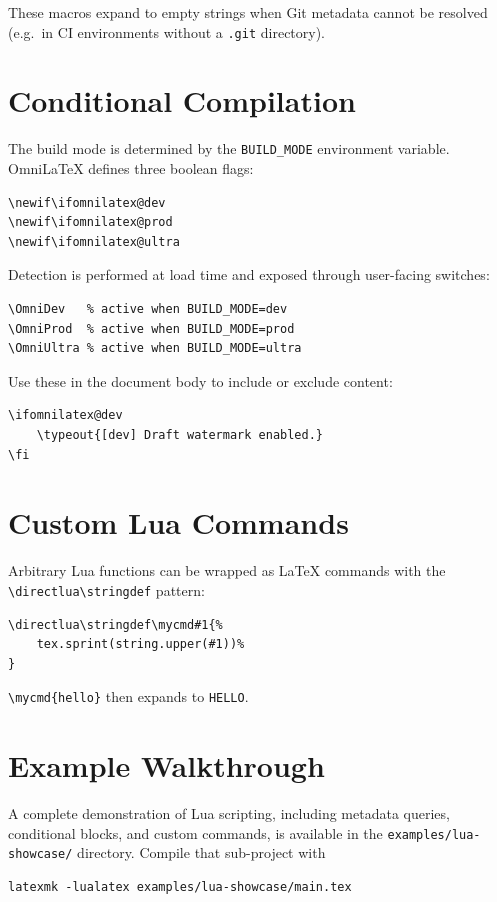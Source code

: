 These macros expand to empty strings when Git metadata cannot be resolved
(e.g.\ in CI environments without a \texttt{.git} directory).

\section{Conditional Compilation}

The build mode is determined by the \texttt{BUILD\_MODE} environment
variable.  OmniLaTeX defines three boolean flags:

\begin{verbatim}
\newif\ifomnilatex@dev
\newif\ifomnilatex@prod
\newif\ifomnilatex@ultra
\end{verbatim}

Detection is performed at load time and exposed through user-facing
switches:

\begin{verbatim}
\OmniDev   % active when BUILD_MODE=dev
\OmniProd  % active when BUILD_MODE=prod
\OmniUltra % active when BUILD_MODE=ultra
\end{verbatim}

Use these in the document body to include or exclude content:

\begin{verbatim}
\ifomnilatex@dev
    \typeout{[dev] Draft watermark enabled.}
\fi
\end{verbatim}

\section{Custom Lua Commands}

Arbitrary Lua functions can be wrapped as \LaTeX{} commands with the
\texttt{\textbackslash directlua\textbackslash stringdef} pattern:

\begin{verbatim}
\directlua\stringdef\mycmd#1{%
    tex.sprint(string.upper(#1))%
}
\end{verbatim}

\texttt{\textbackslash mycmd\{hello\}} then expands to \texttt{HELLO}.

\section{Example Walkthrough}

A complete demonstration of Lua scripting, including metadata queries,
conditional blocks, and custom commands, is available in the
\texttt{examples/lua-showcase/} directory.  Compile that sub-project with

\begin{verbatim}
latexmk -lualatex examples/lua-showcase/main.tex
\end{verbatim}
